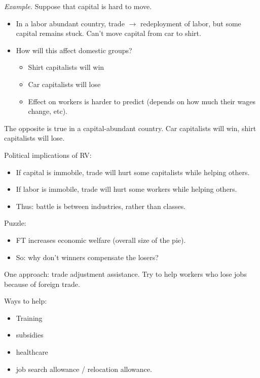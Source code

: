 \documentclass{article}
\begin{document}
{\it Example.} Suppose that capital is hard to move.

\begin{itemize}
  \item In a labor abundant country, trade $\to$ redeployment of labor, but some capital remains stuck.  Can't move capital from car to shirt.
  \item How will this affect domestic groups?
    \begin{itemize}
      \item Shirt capitalists will win
      \item Car capitalists will lose
      \item Effect on workers is harder to predict (depends on how much their wages change, etc).
    \end{itemize}
\end{itemize}

The opposite is true in a capital-abundant country.  Car capitalists will win, shirt capitalists will lose.

Political implications of RV:

\begin{itemize}
  \item If capital is immobile, trade will hurt some capitalists while helping others.
  \item If labor is immobile, trade will hurt some workers while helping others.
  \item Thus: battle is between industries, rather than classes.
\end{itemize}

Puzzle:
\begin{itemize}
  \item FT increases economic welfare (overall size of the pie).
  \item So: why don't winners compensate the losers?
\end{itemize}

One approach: trade adjustment assistance.  Try to help workers who lose jobs because of foreign trade. 

Ways to help:
\begin{itemize}
  \item Training
  \item subsidies
  \item healthcare
  \item job search allowance / relocation allowance.
\end{itemize}
\end{document}
